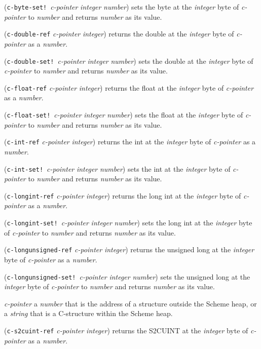 \documentclass[10pt,twocolumn]{article}
\begin{document}
(\texttt{c-byte-set!}\ \emph{c-pointer} \emph{integer} \emph{number})
sets the byte at the \emph{integer} byte of \emph{c-pointer} to
\emph{number} and returns \emph{number} as its value.

(\texttt{c-double-ref} \emph{c-pointer} \emph{integer}) returns the
double at the \emph{integer} byte of \emph{c-pointer} as a
\emph{number}.

(\texttt{c-double-set!}\ \emph{c-pointer} \emph{integer}
\emph{number}) sets the double at the \emph{integer} byte of
\emph{c-pointer} to \emph{number} and returns \emph{number} as its
value.

(\texttt{c-float-ref} \emph{c-pointer} \emph{integer}) returns the
float at the \emph{integer} byte of \emph{c-pointer} as a
\emph{number}.

(\texttt{c-float-set!}\ \emph{c-pointer} \emph{integer} \emph{number})
sets the float at the \emph{integer} byte of \emph{c-pointer} to
\emph{number} and returns \emph{number} as its value.

(\texttt{c-int-ref} \emph{c-pointer} \emph{integer}) returns the int
at the \emph{integer} byte of \emph{c-pointer} as a \emph{number}.

(\texttt{c-int-set!}\ \emph{c-pointer} \emph{integer} \emph{number})
sets the int at the \emph{integer} byte of \emph{c-pointer} to
\emph{number} and returns \emph{number} as its value.

(\texttt{c-longint-ref} \emph{c-pointer} \emph{integer}) returns the
long int at the \emph{integer} byte of \emph{c-pointer} as a
\emph{number}.

(\texttt{c-longint-set!}\ \emph{c-pointer} \emph{integer}
\emph{number}) sets the long int at the \emph{integer} byte of
\emph{c-pointer} to \emph{number} and returns \emph{number} as its
value.

(\texttt{c-longunsigned-ref} \emph{c-pointer} \emph{integer}) returns
the unsigned long at the \emph{integer} byte of \emph{c-pointer} as a
\emph{number}.

(\texttt{c-longunsigned-set!}\ \emph{c-pointer} \emph{integer}
\emph{number}) sets the unsigned long at the \emph{integer} byte of
\emph{c-pointer} to \emph{number} and returns \emph{number} as its
value.

\emph{c-pointer} a \emph{number} that is the address of a structure
outside the Scheme heap, or a \emph{string} that is a C-structure
within the Scheme heap.

(\texttt{c-s2cuint-ref} \emph{c-pointer} \emph{integer}) returns the
S2CUINT at the \emph{integer} byte of \emph{c-pointer} as a
\emph{number}.
\end{document}
